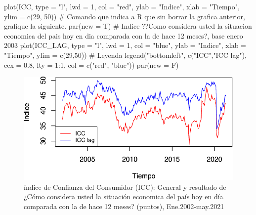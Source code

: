 \documentclass[
  a4paper,
]{article}
\newenvironment{Shaded}{}{}
\newcommand{\AttributeTok}[1]{\textcolor[rgb]{0.84,0.23,0.29}{#1}}
\newcommand{\CommentTok}[1]{\textcolor[rgb]{0.42,0.45,0.49}{#1}}
\newcommand{\DecValTok}[1]{\textcolor[rgb]{0.00,0.36,0.77}{#1}}
\newcommand{\FloatTok}[1]{\textcolor[rgb]{0.00,0.36,0.77}{#1}}
\newcommand{\FunctionTok}[1]{\textcolor[rgb]{0.44,0.26,0.76}{#1}}
\newcommand{\NormalTok}[1]{\textcolor[rgb]{0.14,0.16,0.18}{#1}}
\newcommand{\SpecialCharTok}[1]{\textcolor[rgb]{0.00,0.36,0.77}{#1}}
\newcommand{\StringTok}[1]{\textcolor[rgb]{0.01,0.18,0.38}{#1}}
\begin{document}
\begin{Shaded}
\begin{Highlighting}[]
\FunctionTok{plot}\NormalTok{(ICC, }\AttributeTok{type =} \StringTok{"l"}\NormalTok{, }\AttributeTok{lwd =} \DecValTok{1}\NormalTok{, }\AttributeTok{col =} \StringTok{"red"}\NormalTok{, }\AttributeTok{ylab =} \StringTok{"Indice"}\NormalTok{, }\AttributeTok{xlab =} \StringTok{"Tiempo"}\NormalTok{, }\AttributeTok{ylim =} \FunctionTok{c}\NormalTok{(}\DecValTok{29}\NormalTok{, }\DecValTok{50}\NormalTok{))}
\CommentTok{\# Comando que indica a R que sin borrar la grafica anterior, grafique la siguiente.}
\FunctionTok{par}\NormalTok{(}\AttributeTok{new =}\NormalTok{ T)}
\CommentTok{\# Indice ??Como considera usted la situacion economica del pais hoy en dia comparada con la de hace 12 meses?, base enero 2003}
\FunctionTok{plot}\NormalTok{(ICC\_LAG, }\AttributeTok{type =} \StringTok{"l"}\NormalTok{, }\AttributeTok{lwd =} \DecValTok{1}\NormalTok{, }\AttributeTok{col =} \StringTok{"blue"}\NormalTok{, }\AttributeTok{ylab =} \StringTok{"Indice"}\NormalTok{, }\AttributeTok{xlab =} \StringTok{"Tiempo"}\NormalTok{, }\AttributeTok{ylim =} \FunctionTok{c}\NormalTok{(}\DecValTok{29}\NormalTok{,}\DecValTok{50}\NormalTok{))}
\CommentTok{\# Leyenda}
\FunctionTok{legend}\NormalTok{(}\StringTok{"bottomleft"}\NormalTok{, }\FunctionTok{c}\NormalTok{(}\StringTok{"ICC"}\NormalTok{,}\StringTok{"ICC lag"}\NormalTok{), }\AttributeTok{cex =} \FloatTok{0.8}\NormalTok{, }\AttributeTok{lty =} \DecValTok{1}\SpecialCharTok{:}\DecValTok{1}\NormalTok{, }\AttributeTok{col =} \FunctionTok{c}\NormalTok{(}\StringTok{"red"}\NormalTok{, }\StringTok{"blue"}\NormalTok{))}
\FunctionTok{par}\NormalTok{(}\AttributeTok{new =}\NormalTok{ F)}
\end{Highlighting}
\end{Shaded}

\begin{figure}[H]

\caption{\label{fig-fig2}índice de Confianza del Consumidor (ICC):
General y resultado de ¿Cómo considera usted la situación economica del
país hoy en día comparada con la de hace 12 meses? (puntos),
Ene.2002-may.2021}

{\centering \includegraphics{index_files/figure-pdf/fig-fig2-1.pdf}

}

\end{figure}
\end{document}
